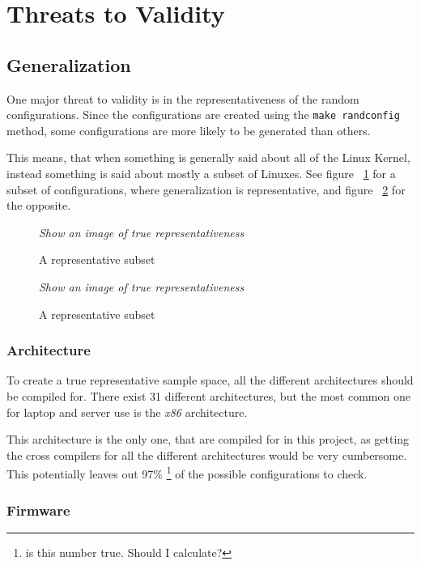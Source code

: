 \documentclass[a4paper,11pt]{article}
\newcommand{\textcode}[1]{
    \texttt{\colorbox{gray!20}{#1}}
}
\newcommand{\figa}{
    \begin{figure}[!htpb]
    \centering
}
\newcommand{\figb}[2]{
    \caption{#1}
    \label{#2}
    \end{figure}
}
\begin{document}
\newpage
\section{Threats to Validity}



\subsection{Generalization}

One major threat to validity is in the representativeness of the random 
configurations. Since the configurations are created using the \textcode{make 
randconfig} method, some configurations are more likely to be generated than 
others.

This means, that when something is generally said about all of the Linux 
Kernel, instead something is said about mostly a subset of Linuxes. See figure 
~\ref{fig:repsubset} for a subset of configurations, where generalization is 
representative, and figure ~\ref{fig:unrepsubset} for the opposite.

\figa
    \emph{Show an image of true representativeness}
\figb{A representative subset}{fig:repsubset}

\figa
    \emph{Show an image of true representativeness}
\figb{A representative subset}{fig:unrepsubset}

\subsubsection{Architecture}

To create a true representative sample space, all the different architectures 
should be compiled for. There exist 31 different architectures, but the most 
common one for laptop and server use is the \emph{x86} architecture.

This architecture is the only one, that are compiled for in this project, as 
getting the cross compilers for all the different architectures would be very 
cumbersome. \\


This potentially leaves out 97\% \footnote{is this number true. Should I 
calculate?} of the possible configurations to check.

\subsubsection{Firmware}
\end{document}
